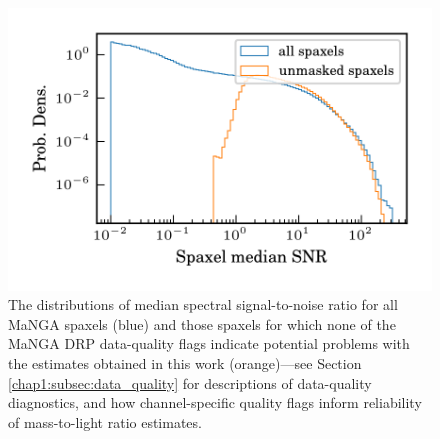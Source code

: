 \begin{figure}
    \centering
    \includegraphics[width=\columnwidth]{spax_snr}
    \caption[Median spaxel signal-to-noise ratios]{\fixspacing The distributions of median spectral signal-to-noise ratio for all MaNGA spaxels (blue) and those spaxels for which none of the MaNGA DRP data-quality flags indicate potential problems with the estimates obtained in this work (orange)---see Section \ref{chap1:subsec:data_quality} for descriptions of data-quality diagnostics, and how channel-specific quality flags inform reliability of mass-to-light ratio estimates.}
    \label{fig:spax_snr}
\end{figure}